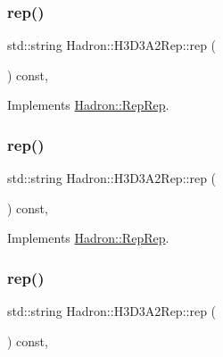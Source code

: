 \subsubsection{\texorpdfstring{rep()}{rep()}\hspace{0.1cm}{\footnotesize\ttfamily [2/5]}}
{\footnotesize\ttfamily std\+::string Hadron\+::\+H3\+D3\+A2\+Rep\+::rep (\begin{DoxyParamCaption}{ }\end{DoxyParamCaption}) const\hspace{0.3cm}{\ttfamily [inline]}, {\ttfamily [virtual]}}



Implements \mbox{\hyperlink{structHadron_1_1RepRep_ab3213025f6de249f7095892109575fde}{Hadron\+::\+Rep\+Rep}}.

\mbox{\label{structHadron_1_1H3D3A2Rep_a2634fb1518fc2bc1d80d435e4e83aff3}} 
\subsubsection{\texorpdfstring{rep()}{rep()}\hspace{0.1cm}{\footnotesize\ttfamily [3/5]}}
{\footnotesize\ttfamily std\+::string Hadron\+::\+H3\+D3\+A2\+Rep\+::rep (\begin{DoxyParamCaption}{ }\end{DoxyParamCaption}) const\hspace{0.3cm}{\ttfamily [inline]}, {\ttfamily [virtual]}}



Implements \mbox{\hyperlink{structHadron_1_1RepRep_ab3213025f6de249f7095892109575fde}{Hadron\+::\+Rep\+Rep}}.

\mbox{\label{structHadron_1_1H3D3A2Rep_a2634fb1518fc2bc1d80d435e4e83aff3}} 
\subsubsection{\texorpdfstring{rep()}{rep()}\hspace{0.1cm}{\footnotesize\ttfamily [4/5]}}
{\footnotesize\ttfamily std\+::string Hadron\+::\+H3\+D3\+A2\+Rep\+::rep (\begin{DoxyParamCaption}{ }\end{DoxyParamCaption}) const\hspace{0.3cm}{\ttfamily [inline]}, {\ttfamily [virtual]}}



